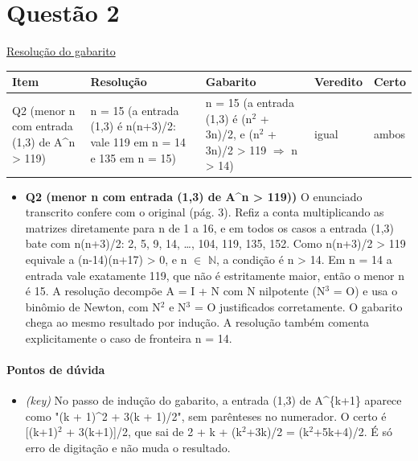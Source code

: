 \documentclass{article}%
\begin{document}
\section*{Questão 2}%
\href{https://poliedroresolve.sistemapoliedro.com.br/vestibulares/ita/2026/ita-2-fase-dia-1-28-10-2025-2-fase-dia-1/dissertativa-2-matematica-2-fase-dia-1-ita-2026}{Resolução do gabarito}\par\smallskip%
\begin{longtable}{@{}p{} p{} p{} p{} p{}@{}}\toprule Item & Resolução & Gabarito & Veredito & Certo \\ \midrule
Q2 (menor n com entrada (1,3) de A\^{}n > 119) & n = 15 (a entrada (1,3) é n(n+3)/2: vale 119 em n = 14 e 135 em n = 15) & n = 15 (a entrada (1,3) é (n$^2$ + 3n)/2, e (n$^2$ + 3n)/2 > 119 $\Rightarrow$ n > 14) & igual & ambos \\
\bottomrule\end{longtable}%
\begin{itemize}%
\item%
\textbf{Q2 (menor n com entrada (1,3) de A\^{}n > 119))} O enunciado transcrito confere com o original (pág. 3). Refiz a conta multiplicando as matrizes diretamente para n de 1 a 16, e em todos os casos a entrada (1,3) bate com n(n+3)/2: 2, 5, 9, 14, \ldots{}, 104, 119, 135, 152. Como n(n+3)/2 > 119 equivale a (n-14)(n+17) > 0, e n $\in$ $\mathbb{N}$, a condição é n > 14. Em n = 14 a entrada vale exatamente 119, que não é estritamente maior, então o menor n é 15. A resolução decompõe A = I + N com N nilpotente (N$^3$ = O) e usa o binômio de Newton, com N$^2$ e N$^3$ = O justificados corretamente. O gabarito chega ao mesmo resultado por indução. A resolução também comenta explicitamente o caso de fronteira n = 14.%
\end{itemize}%
\paragraph{Pontos de dúvida}%
\begin{itemize}%
\item%
\textit{(key)} No passo de indução do gabarito, a entrada (1,3) de A\^{}\{k+1\} aparece como "(k + 1)\^{}2 + 3(k + 1)/2", sem parênteses no numerador. O certo é {[}(k+1)$^2$ + 3(k+1){]}/2, que sai de 2 + k + (k$^2$+3k)/2 = (k$^2$+5k+4)/2. É só erro de digitação e não muda o resultado.%
\end{itemize}%
\end{document}
